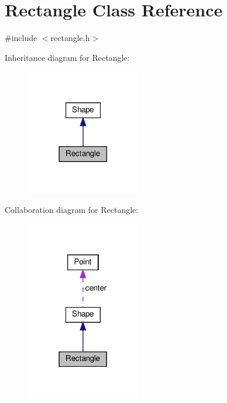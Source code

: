 \hypertarget{class_rectangle}{}\section{Rectangle Class Reference}
\label{class_rectangle}


{\ttfamily \#include $<$rectangle.\+h$>$}



Inheritance diagram for Rectangle\+:
\nopagebreak
\begin{figure}[H]
\begin{center}
\leavevmode
\includegraphics[width=141pt]{class_rectangle__inherit__graph}
\end{center}
\end{figure}


Collaboration diagram for Rectangle\+:
\nopagebreak
\begin{figure}[H]
\begin{center}
\leavevmode
\includegraphics[width=142pt]{class_rectangle__coll__graph}
\end{center}
\end{figure}

